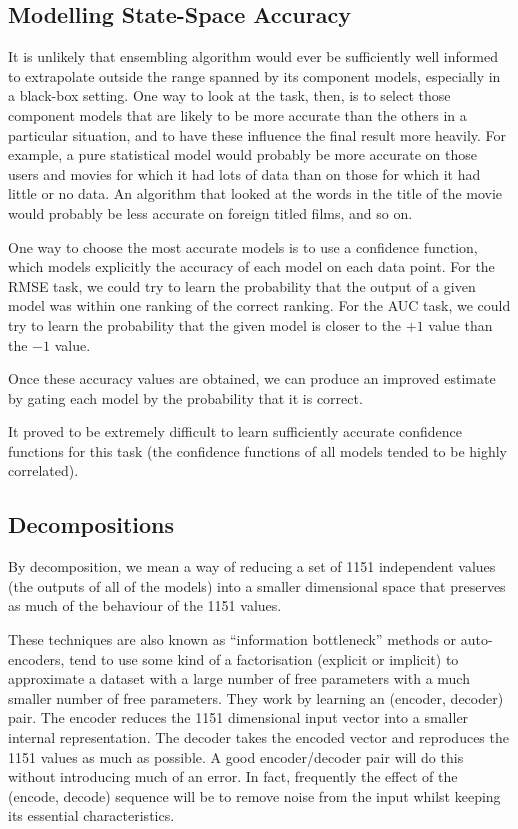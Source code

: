 \documentclass{article}
\begin{document}
\subsection{Modelling State-Space Accuracy}

It is unlikely that ensembling algorithm would ever be sufficiently well informed to extrapolate outside the range spanned by its component models, especially in a black-box setting.
One way to look at the task, then, is to select those component models that are likely to be more accurate than the others in a particular situation, and to have these influence the final result more heavily.
For example, a pure statistical model would probably be more accurate on those users and movies for which it had lots of data than on those for which it had little or no data.  An algorithm that looked at the words in the title of the movie would probably be less accurate on foreign titled films, and so on.

One way to choose the most accurate models is to use a confidence function, which models explicitly the accuracy of each model on each data point.
For the RMSE task, we could try to learn the probability that the output of a given model was within one ranking of the correct ranking.  
For the AUC task, we could try to learn the probability that the given model is closer to the $+1$ value than the $-1$ value.

Once these accuracy values are obtained, we can produce an improved estimate by gating each model by the probability that it is correct.

It proved to be extremely difficult to learn sufficiently accurate confidence functions for this task (the confidence functions of all models tended to be highly correlated).

\subsection{Decompositions}

By decomposition, we mean a way of reducing a set of 1151 independent values (the outputs of all of the models) into a smaller dimensional space that preserves as much of the behaviour of the 1151 values.

These techniques are also known as ``information bottleneck'' methods or auto-encoders, tend to use some kind of a factorisation (explicit or implicit) to approximate a dataset with a large number of free parameters with a much smaller number of free parameters.
They work by learning an (encoder, decoder) pair.  The encoder reduces the 1151 dimensional input vector into a smaller internal representation.  The decoder takes the encoded vector and reproduces the 1151 values as much as possible.  A good encoder/decoder pair will do this without introducing much of an error.  In fact, frequently the effect of the (encode, decode) sequence will be to remove noise from the input whilst keeping its essential characteristics.
\end{document}
